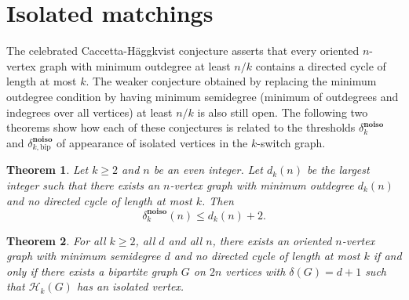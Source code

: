 \documentclass[11pt,a4paper]{article}
\newtheorem{theorem}{Theorem}[section]
\theoremstyle{definition}
\begin{document}
\section{Isolated matchings}\label{sec:isolated}
The celebrated Caccetta-Häggkvist conjecture \cite{caccetta1978Minimal} asserts
that every oriented $n$-vertex graph with minimum outdegree at least $n/k$
contains a directed cycle of length at most $k$. The weaker conjecture obtained
by replacing the minimum outdegree condition by having minimum semidegree
(minimum of outdegrees and indegrees over all vertices) at least $n/k$ is also
still open. The following two theorems show how each of these conjectures is related to the thresholds
$\delta^{\mathbf{no iso}}_k$ and $\delta^{\mathbf{no iso}}_{k,\mathrm{bip}}$ of
appearance of isolated vertices in the $k$-switch graph.
\begin{theorem}\label{thm:isolated_Caccetta}
  Let $k \ge 2$ and $n$ be an even integer. Let $d_k(n)$ be the largest integer such
  that there exists an $n$-vertex graph with minimum \emph{outdegree} $d_k(n)$ and no
  directed cycle of length at most $k$. Then
  $$\delta^{\mathbf{no iso}}_k(n) \le d_k(n)+2.$$
\end{theorem}

\begin{theorem}\label{thm:isolated_Caccetta_bip}
  For all $k \ge 2$, all $d$ and all $n$, there exists an oriented $n$-vertex
  graph with minimum \emph{semidegree} $d$ and no directed cycle of length at
  most $k$ if and only if there exists a bipartite graph $G$ on $2n$ vertices
  with $\delta(G) = d+1$ such that $\mathcal H_k(G)$ has an isolated vertex.
\end{theorem}
\end{document}
